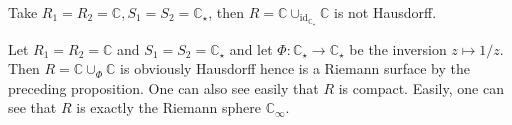\begin{example}
    Take $R_1=R_2=\mathbb C,S_1=S_2=\mathbb C_\star$, then $R=\mathbb C\cup_{\operatorname{id}_{\mathbb C_\star}}\mathbb C$ is not Hausdorff.
\end{example}
\begin{example}
    Let $R_1=R_2=\mathbb C$ and $S_1=S_2=\mathbb C_\star$ and let $\Phi:\mathbb C_\star\to\mathbb C_\star$ be the inversion $z\mapsto 1/z$.
    Then $R=\mathbb C\cup_\Phi\mathbb C$ is obviously Hausdorff hence is a Riemann surface by the preceding proposition.
    One can also see easily that $R$ is compact.
    Easily, one can see that $R$ is exactly the Riemann sphere $\mathbb C_\infty$.
\end{example}